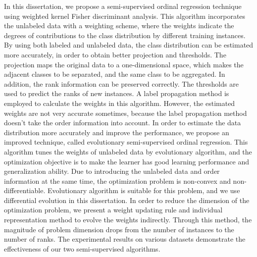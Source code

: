 \begin{enabstract}
In this dissertation, we propose a semi-supervised ordinal regression technique using weighted kernel Fisher discriminant analysis. This algorithm incorporates the unlabeled data with a weighting scheme, where the weights indicate the degrees of contributions to the class distribution by different training instances. By using both labeled and unlabeled data, the class distribution can be estimated more accurately, in order to obtain better projection and thresholds. The projection maps the original data to a one-dimensional space, which makes the adjacent classes to be separated, and the same class to be aggregated. In addition, the rank information can be preserved correctly. The thresholds are used to predict the ranks of new instances. A label propagation method is employed to calculate the weights in this algorithm. However, the estimated weights are not very accurate sometimes, because the label propagation method doesn't take the order information into account. In order to estimate the data distribution more accurately and improve the performance, we propose an improved technique, called evolutionary semi-supervised ordinal regression. This algorithm tunes the weights of unlabeled data by evolutionary algorithm, and the optimization objective is to make the learner has good learning performance and generalization ability. Due to introducing the unlabeled data and order information at the same time, the optimization problem is non-convex and non-differentiable. Evolutionary algorithm is suitable for this problem, and we use differential evolution in this dissertation. In order to reduce the dimension of the optimization problem, we present a weight updating rule and individual representation method to evolve the weights indirectly. Through this method, the magnitude of problem dimension drops from the number of instances to the number of ranks. The experimental results on various datasets demonstrate the effectiveness of our two semi-supervised algorithms. 


\end{enabstract}
